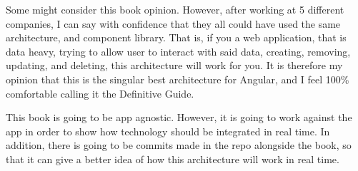Some might consider this book opinion. However, after working at 5 different
companies, I can say with confidence that they all could have used the same
architecture, and component library. That is, if you a web application, that
is data heavy, trying to allow user to interact with said data, creating,
removing, updating, and deleting, this architecture will work for you. It is
therefore my opinion that this is the singular best architecture for Angular,
and I feel 100\% comfortable calling it the Definitive Guide.

This book is going to be app agnostic. However, it is going to work against the
app in order to show how technology should be integrated in real time. In
addition, there is going to be commits made in the repo alongside the book,
so that it can give a better idea of how this architecture will work in real
time.
